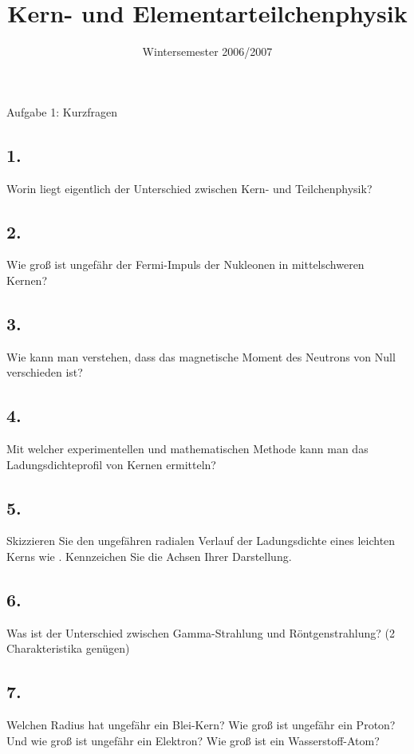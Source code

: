 

\subject{KET}
\title{Kern- und Elementarteilchenphysik}
\date{
    Wintersemester 2006/2007
}



\maketitle
\thispagestyle{empty}
\newpage


\begin{aufgabe}{Aufgabe 1: Kurzfragen}
    \subsection{1.}
    Worin liegt eigentlich der Unterschied zwischen Kern- und Teilchenphysik?

    \subsection{2.}
    Wie groß ist ungefähr der Fermi-Impuls der Nukleonen in mittelschweren Kernen?

    \subsection{3.}
    Wie kann man verstehen, dass das magnetische Moment des Neutrons von Null verschieden ist?

    \subsection{4.}
    Mit welcher experimentellen und mathematischen Methode kann man das Ladungsdichteprofil von Kernen ermitteln?

    \subsection{5.}
    Skizzieren Sie den ungefähren radialen Verlauf der Ladungsdichte eines leichten Kerns wie .
    Kennzeichen Sie die Achsen Ihrer Darstellung.

    \subsection{6.}
    Was ist der Unterschied zwischen Gamma-Strahlung und Röntgenstrahlung?
    (2 Charakteristika genügen)

    \subsection{7.}
    Welchen Radius hat ungefähr ein Blei-Kern?
    Wie groß ist ungefähr ein Proton?
    Und wie groß ist ungefähr ein Elektron?
    Wie groß ist ein Wasserstoff-Atom?


\end{aufgabe}

